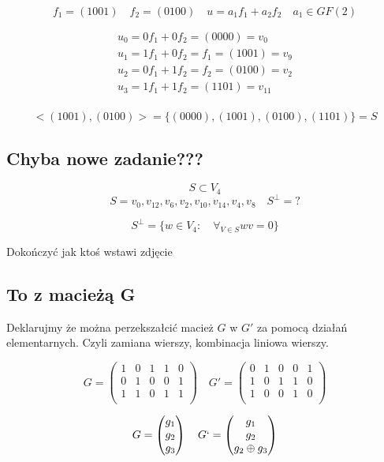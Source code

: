 \documentclass[12pt]{article}
\begin{document}
$$f_1 = (1001) \quad f_2 =(0100) \quad u = a_1f_1+a_2f_2 \quad a_1 \in GF(2) $$

\begin{align*}
    u_0 = 0f_1+0f_2 = (0000) = v_0 \\
    u_1 = 1f_1+0f_2 = f_1  = (1001) = v_9 \\
    u_2 = 0f_1+1f_2 = f_2 = (0100) = v_2 \\
    u_3 = 1f_1+1f_2 = (1101) = v_{11} \\
\end{align*}

$$<(1001),(0100)> = \{(0000), (1001),(0100),(1101)\} = S $$

\subsection*{Chyba nowe zadanie???}

$$S \subset V_4 $$
$$S = {v_0, v_12, v_6, v_2, v_10, v_14, v_4, v_8} \quad S^{\perp} = ?$$

$$S^{\perp} = \{ w \in V_4: \quad \forall_{V \in S} wv=0 \} $$

Dokończyć jak ktoś wstawi zdjęcie

\subsection*{To z macieżą G}

Deklarujmy że można perzekszałcić macież $G$ w $G'$ za pomocą działań elementarnych. 
Czyli zamiana wierszy, kombinacja liniowa wierszy. 

$$
G=
\begin{pmatrix}
    1 & 0 & 1 & 1 & 0 \\
    0 & 1 & 0 & 0 & 1 \\
    1 & 1 & 0 & 1 & 1 \\
\end{pmatrix}
\quad
G'=
\begin{pmatrix}
    0 & 1 & 0 & 0 & 1 \\
    1 & 0 & 1 & 1 & 0 \\
    1 & 0 & 0 & 1 & 0 \\
\end{pmatrix}
 $$

$$G = 
\begin{pmatrix}
    g_1 \\
    g_2 \\
    g_3 \\
\end{pmatrix}
\quad
G` = 
\begin{pmatrix}
    g_1 \\
    g_2 \\
    g_2 \oplus g_3 \\
\end{pmatrix}
$$
\end{document}
